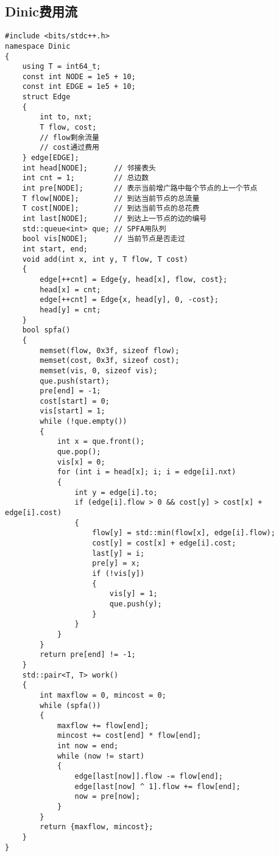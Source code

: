 \documentclass{ctexbook}  %
\begin{document}
\subsection{Dinic费用流}
\lstset{basicstyle=	tfamily}
\begin{Verbatim}[fontsize=\small]
#include <bits/stdc++.h>
namespace Dinic
{
    using T = int64_t;
    const int NODE = 1e5 + 10;
    const int EDGE = 1e5 + 10;
    struct Edge
    {
        int to, nxt;
        T flow, cost;
        // flow剩余流量
        // cost通过费用
    } edge[EDGE];
    int head[NODE];      // 邻接表头
    int cnt = 1;         // 总边数
    int pre[NODE];       // 表示当前增广路中每个节点的上一个节点
    T flow[NODE];        // 到达当前节点的总流量
    T cost[NODE];        // 到达当前节点的总花费
    int last[NODE];      // 到达上一节点的边的编号
    std::queue<int> que; // SPFA用队列
    bool vis[NODE];      // 当前节点是否走过
    int start, end;
    void add(int x, int y, T flow, T cost)
    {
        edge[++cnt] = Edge{y, head[x], flow, cost};
        head[x] = cnt;
        edge[++cnt] = Edge{x, head[y], 0, -cost};
        head[y] = cnt;
    }
    bool spfa()
    {
        memset(flow, 0x3f, sizeof flow);
        memset(cost, 0x3f, sizeof cost);
        memset(vis, 0, sizeof vis);
        que.push(start);
        pre[end] = -1;
        cost[start] = 0;
        vis[start] = 1;
        while (!que.empty())
        {
            int x = que.front();
            que.pop();
            vis[x] = 0;
            for (int i = head[x]; i; i = edge[i].nxt)
            {
                int y = edge[i].to;
                if (edge[i].flow > 0 && cost[y] > cost[x] + edge[i].cost)
                {
                    flow[y] = std::min(flow[x], edge[i].flow);
                    cost[y] = cost[x] + edge[i].cost;
                    last[y] = i;
                    pre[y] = x;
                    if (!vis[y])
                    {
                        vis[y] = 1;
                        que.push(y);
                    }
                }
            }
        }
        return pre[end] != -1;
    }
    std::pair<T, T> work()
    {
        int maxflow = 0, mincost = 0;
        while (spfa())
        {
            maxflow += flow[end];
            mincost += cost[end] * flow[end];
            int now = end;
            while (now != start)
            {
                edge[last[now]].flow -= flow[end];
                edge[last[now] ^ 1].flow += flow[end];
                now = pre[now];
            }
        }
        return {maxflow, mincost};
    }
}

\end{Verbatim}
\end{document}
